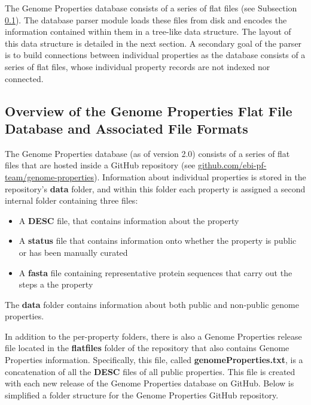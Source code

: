 The Genome Properties database consists of a series of flat files (see 
Subsection \ref{Genome-Properties-Files}). The database parser module loads 
these files from disk and encodes the information contained within them in a 
tree-like data structure. The layout of this data structure is detailed in the 
next section. A secondary goal of the parser is to build connections between 
individual properties as the database consists of a series of flat files, whose 
individual property records are not indexed nor connected. 

\subsection{Overview of the Genome Properties Flat File Database and Associated 
File Formats} \label{Genome-Properties-Files} 

The Genome Properties database (as of version 2.0) consists of a series of flat 
files that are hosted inside a GitHub repository (see 
\href{http://github.com/ebi-pf-team/genome-properties}{github.com/ebi-pf-team/genome-properties}). 
Information about individual properties is stored in the repository's 
\textbf{data} folder, and within this folder each property is assigned a second 
internal folder containing three files: 

\FloatBarrier
\begin{itemize}
\item A \textbf{DESC} file, that contains information about the property
\item A \textbf{status} file that contains information onto whether the property 
is public or has been manually curated
\item A \textbf{\gls{fasta}} \cite{pearson19905} file containing representative 
protein sequences that carry out the steps a the property
\end{itemize}

The \textbf{data} folder contains information about both public and non-public 
genome properties. 

In addition to the per-property folders, there is also a Genome Properties 
release file located in the \textbf{flatfiles} folder of the repository that 
also contains Genome Properties information. Specifically, this file, called 
\textbf{genomeProperties.txt}, is a concatenation of all the \textbf{DESC} files 
of all public properties. This file is created with each new release of the 
Genome Properties database on GitHub. Below is simplified a folder structure for 
the Genome Properties GitHub repository.

